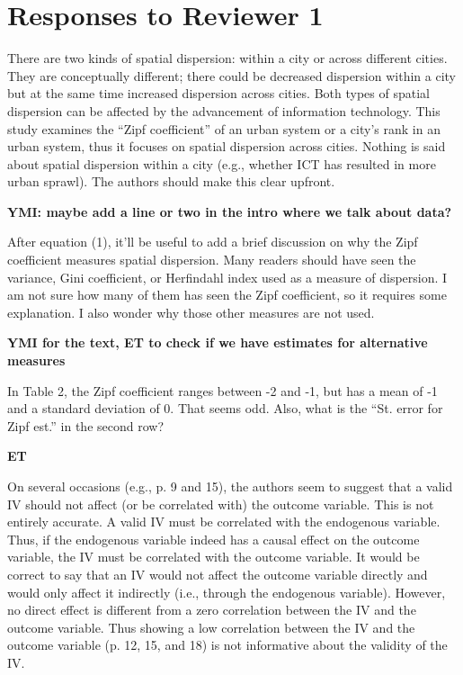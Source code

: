\documentclass[11pt, a4paper, answers]{exam}
\begin{document}
\section*{Responses to Reviewer 1}

\begin{questions}

\question There are two kinds of spatial dispersion: within a city or 
across different cities. They are conceptually different; there could be 
decreased dispersion within a city but at the same time increased 
dispersion across cities. Both types of spatial dispersion can be 
affected by the advancement of information technology. This study 
examines the “Zipf coefficient” of an urban system or a city’s rank 
in an urban system, thus it focuses on spatial dispersion across cities. 
Nothing is said about spatial dispersion within a city (e.g., whether 
ICT has resulted in more urban sprawl). The authors should make this 
clear upfront.

\begin{solution}
\textbf{YMI: maybe add a line or two in the intro where we talk about data?}
\end{solution}

\question After equation (1), it’ll be useful to add a brief discussion 
on why the Zipf coefficient measures spatial dispersion. Many 
readers should have seen the variance, Gini coefficient, or 
Herfindahl index used as a measure of dispersion. I am not 
sure how many of them has seen the Zipf coefficient, so it 
requires some explanation. I also wonder why those other 
measures are not used.

\begin{solution}
\textbf{YMI for the text, ET to check if we have estimates for 
alternative measures}
\end{solution}

\question In Table 2, the Zipf coefficient ranges between -2 and -1, 
but has a mean of -1 and a standard deviation of 0. That seems odd. 
Also, what is the “St. error for Zipf est.” in the second row?

\begin{solution}
\textbf{ET}
\end{solution}

\question On several occasions (e.g., p. 9 and 15), the authors 
seem to suggest that a valid IV should not affect (or be correlated 
with) the outcome variable. This is not entirely accurate. A valid 
IV must be correlated with the endogenous variable. Thus, if the 
endogenous variable indeed has a causal effect on the outcome variable, 
the IV must be correlated with the outcome variable. It would be 
correct to say that an IV would not affect the outcome variable 
directly and would only affect it indirectly (i.e., through the 
endogenous variable). However, no direct effect is different 
from a zero correlation between the IV and the outcome variable. 
Thus showing a low correlation between the IV and the outcome 
variable (p. 12, 15, and 18) is not informative about the validity of the IV.


\end{questions}
\end{document}
